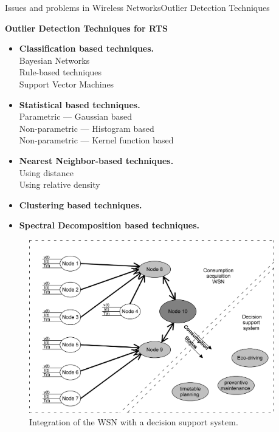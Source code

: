 \begin{frame}{Issues and problems in Wireless Networks}{Outlier Detection Techniques}
\begin{block}{\textbf{Outlier Detection Techniques for RTS}}
	
	\begin{minipage}[t]{0.6\linewidth}
		\begin{itemize}
			\footnotesize
			\item \textbf{Classification based techniques.}\\
			\subitem Bayesian Networks\\
			\subitem Rule-based techniques\\
			\subitem Support Vector Machines
			
			\item \textbf{Statistical based techniques.}\\
			\subitem Parametric --- Gaussian based\\
			\subitem Non-parametric --- Histogram based\\
			\subitem Non-parametric --- Kernel function based
			
			\item \textbf{Nearest Neighbor-based techniques.}\\
			\subitem Using distance\\
			\subitem Using relative density
			
			\item \textbf{Clustering based techniques.}
			
			\item \textbf{Spectral Decomposition based techniques.}
			
		\end{itemize}
	\end{minipage}\hfill
	\begin{minipage}[t]{0.38\linewidth}
		
		\begin{figure}[ht!]
			\centering
			\includegraphics[width=0.95\textwidth,keepaspectratio]{figures/36.Outlier/general}
			\caption{Integration of the \ac{WSN} with a decision support system. }
		\end{figure}
		

\end{minipage}
\end{block}
\end{frame}
